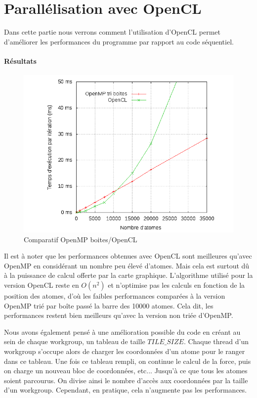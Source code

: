 \section{Parallélisation avec OpenCL}

Dans cette partie nous verrons comment l'utilisation d'OpenCL permet d'améliorer les performances du programme par rapport au code séquentiel.

\paragraph{Résultats}
\begin{figure}[!h]
    \centering
    \includegraphics[scale=0.7]{./img/ocl.png}
    \caption{Comparatif OpenMP boites/OpenCL}
\end{figure}

Il est à noter que les performances obtenues avec OpenCL sont meilleures qu'avec OpenMP en considérant un nombre peu élevé d'atomes.
Mais cela est surtout dû à la puissance de calcul offerte par la carte graphique. L'algorithme utilisé pour la version OpenCL reste en $O(n^2)$ et n'optimise pas les calculs en fonction de la position des atomes, d'où les faibles performances comparées à la version OpenMP trié par boîte passé la barre des 10000 atomes. Cela dit, les performances restent bien meilleurs qu'avec la version non triée d'OpenMP.

Nous avons également pensé à une amélioration possible du code en créant au sein de chaque workgroup, un tableau de taille $TILE\_SIZE$. Chaque thread d'un workgroup s'occupe alors de charger les coordonnées d'un atome pour le ranger dans ce tableau. Une fois ce tableau rempli, on continue le calcul de la force, puis on charge un nouveau bloc de coordonnées, etc... Jusqu'à ce que tous les atomes soient parcourus. On divise ainsi le nombre d'accès aux coordonnées par la taille d'un workgroup. Cependant, en pratique, cela n'augmente pas les performances.